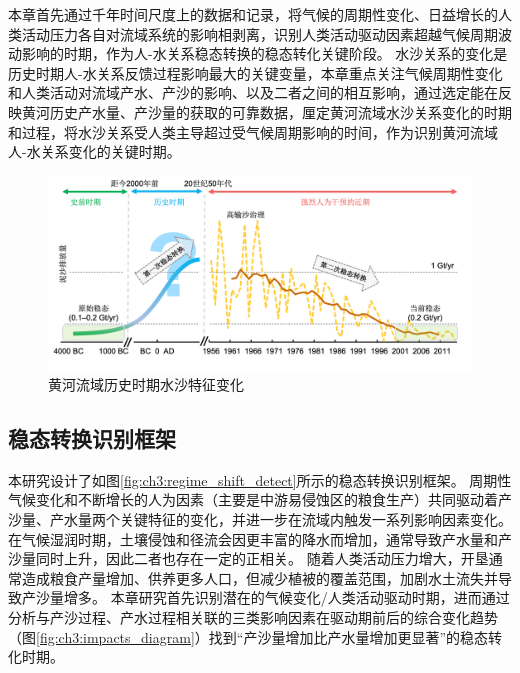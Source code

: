 
本章首先通过千年时间尺度上的数据和记录，将气候的周期性变化、日益增长的人类活动压力各自对流域系统的影响相剥离，识别人类活动驱动因素超越气候周期波动影响的时期，作为人-水关系稳态转换的稳态转化关键阶段。
水沙关系的变化是历史时期人-水关系反馈过程影响最大的关键变量，本章重点关注气候周期性变化和人类活动对流域产水、产沙的影响、以及二者之间的相互影响，通过选定能在反映黄河历史产水量、产沙量的获取的可靠数据，厘定黄河流域水沙关系变化的时期和过程，将水沙关系受人类主导超过受气候周期影响的时间，作为识别黄河流域人-水关系变化的关键时期。

\begin{figure}[!htb] %
    \centering
    \includegraphics[width=\textwidth]{img/ch3/ch3_why_regime_shift.png}
    \caption{黄河流域历史时期水沙特征变化}\label{fig:ch3:why_regime_shift}
\end{figure}

\subsection{稳态转换识别框架}\label{sec:ch3:approach}

本研究设计了如图\ref{fig:ch3:regime_shift_detect}所示的稳态转换识别框架。
周期性气候变化和不断增长的人为因素（主要是中游易侵蚀区的粮食生产）共同驱动着产沙量、产水量两个关键特征的变化，并进一步在流域内触发一系列影响因素变化\cite{xujiongxin2011}。
在气候湿润时期，土壤侵蚀和径流会因更丰富的降水而增加，通常导致产水量和产沙量同时上升，因此二者也存在一定的正相关\cite{GeQuanSheng2011}。
随着人类活动压力增大，开垦通常造成粮食产量增加、供养更多人口，但减少植被的覆盖范围，加剧水土流失并导致产沙量增多\cite{wu2020a}。
本章研究首先识别潜在的气候变化/人类活动驱动时期，进而通过分析与产沙过程、产水过程相关联的三类影响因素在驱动期前后的综合变化趋势（图\ref{fig:ch3:impacts_diagram}）找到“产沙量增加比产水量增加更显著”的稳态转化时期。

